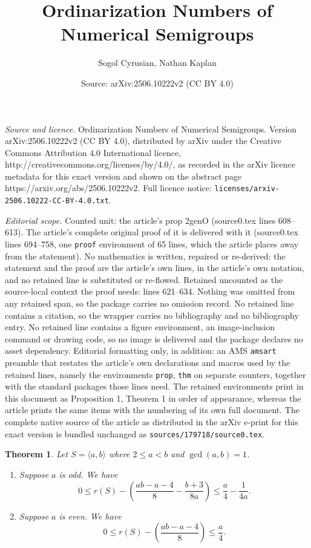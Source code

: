 \documentclass[10pt,a4paper]{amsart}
\title{Ordinarization Numbers of Numerical Semigroups}
\author{Sogol Cyrusian, Nathan Kaplan}
\date{Source: arXiv:2506.10222v2 (CC BY 4.0)}
\newtheorem{thm}{Theorem}
\begin{document}
\maketitle

\noindent\emph{Source and licence.} Ordinarization Numbers of Numerical Semigroups. Version arXiv:2506.10222v2 (CC BY 4.0), distributed by arXiv under the Creative Commons Attribution 4.0 International licence, http://creativecommons.org/licenses/by/4.0/, as recorded in the arXiv licence metadata for this exact version and shown on the abstract page https://arxiv.org/abs/2506.10222v2. Full licence notice: \texttt{licenses/arxiv-2506.10222-CC-BY-4.0.txt}.\par\smallskip

\noindent\textit{Editorial scope.} Counted unit: the article's prop 2genO (source0.tex lines 608--613). The article's complete original proof of it is delivered with it (source0.tex lines 694--758, one \texttt{proof} environment of 65 lines, which the article places away from the statement). No mathematics is written, repaired or re-derived: the statement and the proof are the article's own lines, in the article's own notation, and no retained line is substituted or re-flowed.  Retained uncounted as the source-local context the proof needs: lines 621--634.  Nothing was omitted from any retained span, so the package carries no omission record.  No retained line contains a citation, so the wrapper carries no bibliography and no bibliography entry.  No retained line contains a figure environment, an image-inclusion command or drawing code, so no image is delivered and the package declares no asset dependency.  Editorial formatting only, in addition: an AMS \texttt{amsart} preamble that restates the article's own declarations and macros used by the retained lines, namely the environments \texttt{prop}, \texttt{thm} on separate counters, together with the standard packages those lines need.  The retained environments print in this document as Proposition 1, Theorem 1 in order of appearance, whereas the article prints the same items with the numbering of its own full document.  The complete native source of the article as distributed in the arXiv e-print for this exact version is bundled unchanged as \texttt{sources/179718/source0.tex}.
\begin{thm}\label{thm:ord_e2}
Let $S = \langle a,b \rangle$ where $2\le a < b$ and $\gcd(a,b) = 1$.
\begin{enumerate}
\item Suppose $a$ is odd.  We have
\[
0 \le r(S) - \left( \frac{ab-a-4}{8} - \frac{b+3}{8a}\right) \le \frac{a}{4}-\frac{1}{4a}.
\]

\item Suppose $a$ is even.  We have
\[
0 \le r(S) - \left(\frac{ab-a-4}{8} \right)\le \frac{a}{4}.
\]
\end{enumerate}
\end{thm}
\end{document}

